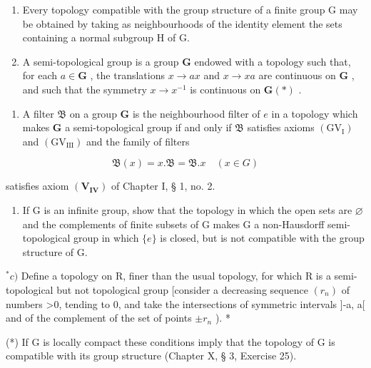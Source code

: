 \BourbakiExercises
\BourbakiExerciseGroup

\begin{enumerate}
\def\labelenumi{\arabic{enumi})}
\item
  Every topology compatible with the group structure of a finite group G may be obtained by taking as neighbourhoods of the identity element the sets containing a normal subgroup H of G.
\item
  A semi-topological group is a group \(\mathbf{G}\) endowed with a topology such that, for each \(a \in \mathbf{G}\) , the translations \(x \to ax\) and \(x \to xa\) are continuous on \(\mathbf{G}\) , and such that the symmetry \(x \to x^{-1}\) is continuous on \(\mathbf{G}(*)\) .
\end{enumerate}

\begin{enumerate}
\def\labelenumi{\alph{enumi})}
\tightlist
\item
  A filter \(\mathfrak{B}\) on a group \(\mathbf{G}\) is the neighbourhood filter of \(e\) in a topology which makes \(\mathbf{G}\) a semi-topological group if and only if \(\mathfrak{B}\) satisfies axioms \((\mathrm{GV}_{\mathrm{I}})\) and \((\mathrm{GV}_{\mathrm{III}})\) and the family of filters
\end{enumerate}

\[
\mathfrak {B} (x) = x. \mathfrak {B} = \mathfrak {B}. x \quad (x \in G)
\]

satisfies axiom \((\mathbf{V}_{\mathbf{IV}})\) of Chapter I, § 1, no. 2.

\begin{enumerate}
\def\labelenumi{\alph{enumi})}
\setcounter{enumi}{1}
\tightlist
\item
  If G is an infinite group, show that the topology in which the open sets are \(\varnothing\) and the complements of finite subsets of G makes G a non-Hausdorff semi-topological group in which \(\{e\}\) is closed, but is not compatible with the group structure of G.
\end{enumerate}

\(^{*}c)\) Define a topology on R, finer than the usual topology, for which R is a semi-topological but not topological group {[}consider a decreasing sequence \((r_{n})\) of numbers \textgreater0, tending to 0, and take the intersections of symmetric intervals {]}-a, a{[} and of the complement of the set of points \(\pm r_{n}\) ). *

(*) If G is locally compact these conditions imply that the topology of G is compatible with its group structure (Chapter X, § 3, Exercise 25).


